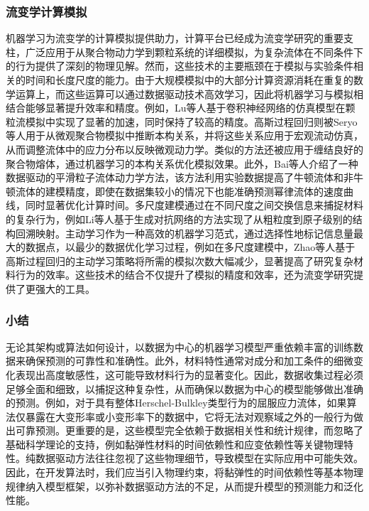 \subsubsection{流变学计算模拟}
机器学习为流变学的计算模拟提供助力，计算平台已经成为流变学研究的重要支柱，广泛应用于从聚合物动力学到颗粒系统的详细模拟，为复杂流体在不同条件下的行为提供了深刻的物理见解。然而，这些技术的主要瓶颈在于模拟与实验条件相关的时间和长度尺度的能力。由于大规模模拟中的大部分计算资源消耗在重复的数学运算上，而这些运算可以通过数据驱动技术高效学习，因此将机器学习与模拟相结合能够显著提升效率和精度。例如，Lu等人基于卷积神经网络的仿真模型在颗粒流模拟中实现了显著的加速，同时保持了较高的精度\cite{lu2021machine}。高斯过程回归则被Seryo等人用于从微观聚合物模拟中推断本构关系，并将这些关系应用于宏观流动仿真，从而调整流体中的应力分布以反映微观动力学\cite{seryoLearningConstitutiveRelation2020}。类似的方法还被应用于缠结良好的聚合物熔体，通过机器学习的本构关系优化模拟效果。此外，Bai等人介绍了一种数据驱动的平滑粒子流体动力学方法，该方法利用实验数据提高了牛顿流体和非牛顿流体的建模精度，即使在数据集较小的情况下也能准确预测幂律流体的速度曲线，同时显著优化计算时间\cite{baiDatadrivenSmoothedParticle2021}。多尺度建模通过在不同尺度之间交换信息来捕捉材料的复杂行为，例如Li等人基于生成对抗网络的方法实现了从粗粒度到原子级别的结构回溯映射\cite{liBackmappingCoarsegrainedMacromolecules2020}。主动学习作为一种高效的机器学习范式，通过选择性地标记信息量最大的数据点，以最少的数据优化学习过程，例如在多尺度建模中，Zhao等人基于高斯过程回归的主动学习策略将所需的模拟次数大幅减少，显著提高了研究复杂材料行为的效率\cite{zhaoActiveLearningConstitutive2018}。这些技术的结合不仅提升了模拟的精度和效率，还为流变学研究提供了更强大的工具。

\subsubsection{小结}
无论其架构或算法如何设计，以数据为中心的机器学习模型严重依赖丰富的训练数据来确保预测的可靠性和准确性。此外，材料特性通常对成分和加工条件的细微变化表现出高度敏感性，这可能导致材料行为的显著变化。因此，数据收集过程必须足够全面和细致，以捕捉这种复杂性，从而确保以数据为中心的模型能够做出准确的预测。例如，对于具有整体Herschel-Bulkley类型行为的屈服应力流体，如果算法仅暴露在大变形率或小变形率下的数据中，它将无法对观察域之外的一般行为做出可靠预测\cite{mangalDatadrivenTechniquesRheology2025,saadatRheologistsGuidelineDatadriven2023,reyesLearningUnknownPhysics2021}。更重要的是，这些模型完全依赖于数据相关性和统计规律，而忽略了基础科学理论的支持，例如黏弹性材料的时间依赖性和应变依赖性等关键物理特性。纯数据驱动方法往往忽视了这些物理细节，导致模型在实际应用中可能失效。因此，在开发算法时，我们应当引入物理约束，将黏弹性的时间依赖性等基本物理规律纳入模型框架，以弥补数据驱动方法的不足，从而提升模型的预测能力和泛化性能。
